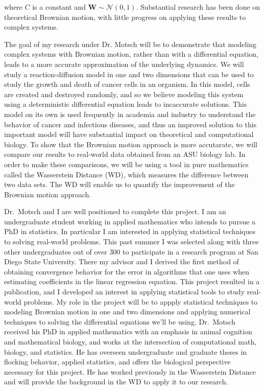 \documentclass[8 pt, leqno]{article}
\begin{document}
\noindent where $C$ is a constant and $\textbf{W} \sim \mathcal{N}(0, 1).$ Substantial research has been done on theoretical Brownian motion, with little progress on applying these results to complex systems. 

The goal of my research under Dr. Motsch will be to demonstrate that modeling complex systems with Brownian motion, rather than with a differential equation, leads to a more accurate approximation of the underlying dynamics. We will study a reaction-diffusion model in one and two dimensions that can be used to study the growth and death of cancer cells in an organism. In this model, cells are created and destroyed randomly, and so we believe modeling this system using a deterministic differential equation leads to incaccurate solutions. This model on its own is used frequently in academia and industry to understand the behavior of cancer and infectious diseases, and thus an improved solution to this important model will have substantial impact on theoretical and computational biology. To show that the Brownian motion approach is more accutarate, we will compare our results to real-world data obtained from an ASU biology lab. In order to make these comparisons, we will be using a tool in pure mathematics called the Wasserstein Distance (WD), which measures the difference between two data sets. The WD will enable us to quantify the improvement of the Brownian motion approach. 




Dr.\ Motsch and I are well positioned to complete this project. I am an undergraduate student working in applied mathematics who intends to pursue a PhD in statistics. In particular I am interested in applying statistical techniques to solving real-world problems. This past summer I was selected along with three other undergraduates out of over 300 to participate in a research program at San Diego State University. There my advisor and I derived the first method of obtaining convergence behavior for the error in algorithms that one uses when estimating coefficients in the linear regression equation. This project resulted in a publication, and I developed an interest in applying statistical tools to study real-world problems. My role in the project will be to appply statistical techniques to modeling Brownian motion in one and two dimensions and applying numerical techniques to solving the differential equations we'll be using. Dr.\ Motsch received his PhD in applied mathematics with an emphasis in animal cognition and mathematical biology, and works at the intersection of computational math, biology, and statistics. He has overseen undergraduate and graduate theses in flocking behavior, applied statistics, and offers the biological perspective necessary for this project. He has worked previously in the Wasserstein Distance and will provide the background in the WD to apply it to our research.
\end{document}
